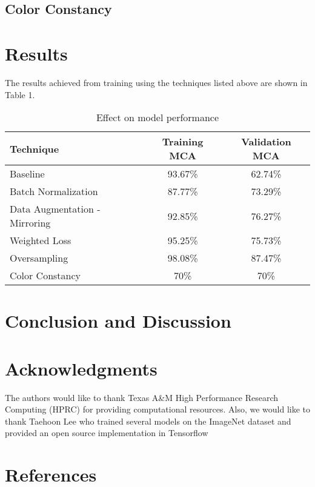 \documentclass[conference]{IEEEtran}
\begin{document}
\subsection{Color Constancy}\label{color-constancy}

    \section{Results}\label{results}

The results achieved from training using the techniques listed above are
shown in Table 1.


\begin{table}[htbp]
\caption{Effect on model performance}
\begin{center}
\begin{tabular}{|l|c|c|}
\hline
\textbf{Technique} & \textbf{Training MCA} & \textbf{Validation MCA}\\
\hline
Baseline & 93.67\% & 62.74\%\\
\hline
Batch Normalization & 87.77\% & 73.29\%\\
\hline
Data Augmentation - Mirroring & 92.85\% & 76.27\%\\
\hline
Weighted Loss & 95.25\% & 75.73\%\\
\hline
Oversampling & 98.08\% & 87.47\%\\
\hline
Color Constancy & 70\% & 70\%\\
\hline
\end{tabular}
\label{tab1}
\end{center}
\end{table}



    \section{Conclusion and Discussion}\label{conclusion-and-discussion}

    \section{Acknowledgments}\label{acknowledgments}

The authors would like to thank Texas A\&M High Performance Research
Computing (HPRC) for providing computational resources. Also, we would
like to thank Taehoon Lee who trained several models on the ImageNet
dataset and provided an open source implementation in Tensorflow

    \section{References}\label{references}


    
    
    
    
\end{document}

